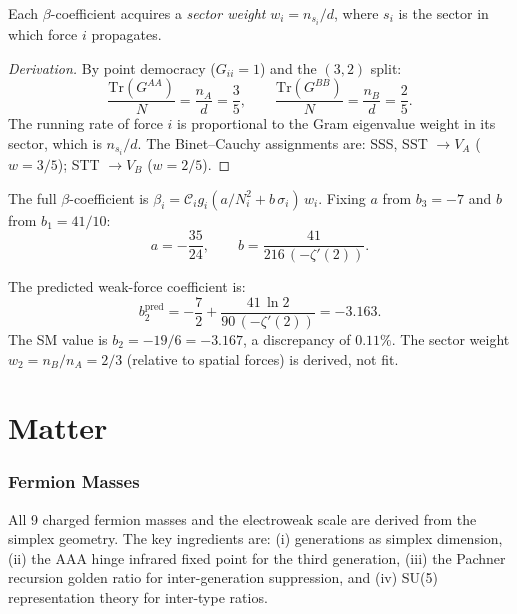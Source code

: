 \documentclass[12pt]{article}
\theoremstyle{remark}
\theoremstyle{definition}
\begin{document}
Each $\beta$-coefficient acquires a \emph{sector weight} $w_i = n_{s_i}/d$, where $s_i$ is the sector in which force $i$ propagates.

\begin{proof}[Derivation]
By point democracy ($G_{ii} = 1$) and the $(3,2)$ split:
\begin{equation}
\frac{\mathrm{Tr}(G^{AA})}{N} = \frac{n_A}{d} = \frac{3}{5}, \qquad \frac{\mathrm{Tr}(G^{BB})}{N} = \frac{n_B}{d} = \frac{2}{5}.
\end{equation}
The running rate of force $i$ is proportional to the Gram eigenvalue weight in its sector, which is $n_{s_i}/d$.  The Binet--Cauchy assignments are: SSS, SST $\to V_A$ ($w = 3/5$); STT $\to V_B$ ($w = 2/5$).
\end{proof}

The full $\beta$-coefficient is $\beta_i = \mathcal{C}_i g_i (a/N_i^2 + b\,\sigma_i)\,w_i$.  Fixing $a$ from $b_3 = -7$ and $b$ from $b_1 = 41/10$:
\begin{equation}
a = -\frac{35}{24}, \qquad b = \frac{41}{216\,(-\zeta'(2))}.
\end{equation}

The predicted weak-force coefficient is:
\begin{equation}
\boxed{b_2^{\mathrm{pred}} = -\frac{7}{2} + \frac{41\,\ln 2}{90\,(-\zeta'(2))} = -3.163.}
\end{equation}
The SM value is $b_2 = -19/6 = -3.167$, a discrepancy of $0.11\%$.  The sector weight $w_2 = n_B/n_A = 2/3$ (relative to spatial forces) is derived, not fit.



\part{Matter}

\section{Fermion Masses}
\label{ch:masses}

All 9 charged fermion masses and the electroweak scale are derived from the simplex geometry. The key ingredients are: (i) generations as simplex dimension, (ii) the AAA hinge infrared fixed point for the third generation, (iii) the Pachner recursion golden ratio for inter-generation suppression, and (iv) SU(5) representation theory for inter-type ratios.
\end{document}
